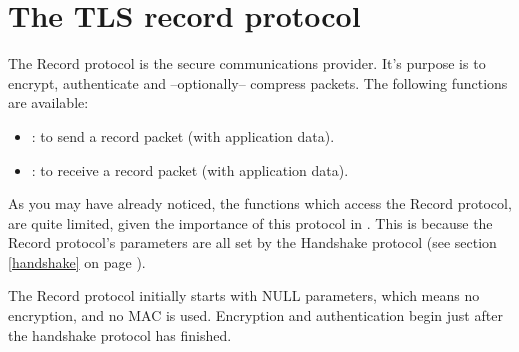 \section{The TLS record protocol}

The Record protocol is the secure communications provider. It's purpose
is to encrypt, authenticate and --optionally-- compress packets.
The following functions are available:
\par
\begin{itemize}
\item {}:
to send a record packet (with application data).
\item {}:
to receive a record packet (with application data).
\end{itemize}

As you may have already noticed, the functions which access the Record protocol,
are quite limited, given the importance of this protocol in \tls{}.
This is because the Record protocol's parameters are all set by
the Handshake protocol (see section \ref{handshake} on page \pageref{handshake}).
\par
The Record protocol initially starts with NULL parameters, which means
no encryption, and no MAC is used. Encryption and authentication begin
just after the handshake protocol has finished.








